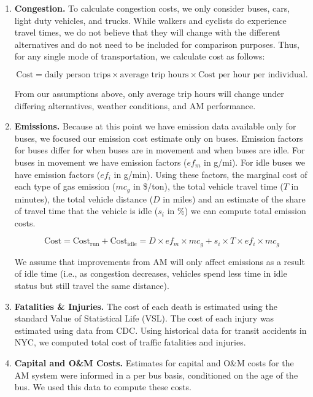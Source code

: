 \documentclass[11pt, letterpaper]{article}
\begin{document}
\begin{enumerate}[leftmargin=*]
\item \textbf{Congestion.}  To calculate congestion costs, we only
  consider
  buses, cars, light duty vehicles, and trucks.  While walkers and
  cyclists do experience travel times, we do not believe that they
  will change with the different alternatives and do not need to be
  included for comparison purposes.  Thus, for any single mode of
  transportation, we calculate cost as follows:
  
  \[\mbox{Cost}=\mbox{daily person trips}\times\mbox{average trip
    hours}\times\mbox{Cost per hour per individual}.\]
  
  From our assumptions above, only average trip hours will change
  under differing alternatives, weather conditions, and AM
  performance.

\item \textbf{Emissions.}  
  Because at this point we have emission data available only for buses, we 
  focused our emission cost estimate only on buses. Emission factors for buses
  differ for when buses are in movement and when buses are idle. For buses in movement 
  we have emission factors ($ef_m$ in g/mi). For idle buses we have emission 
  factors ($ef_{i}$ in g/min). Using these factors, the marginal cost of each type 
  of gas emission ($mc_g$ in \$/ton), the total vehicle travel time ($T$ in minutes), 
  the total vehicle distance ($D$ in miles) and an estimate of the share of travel time that 
  the vehicle is idle ($s_i$ in \%) we can compute total emission costs.

  \[\mbox{Cost}=\mbox{Cost}_{\mbox{run}}+\mbox{Cost}_{\mbox{idle}} = D \times ef_m \times mc_g +  s_i \times T \times  ef_i \times mc_g\]
  
  We assume that improvements from AM will only affect emissions as a result of idle time 
  (i.e., as congestion decreases, vehicles spend less time in idle status but still travel the same distance).
   
\item \textbf{Fatalities \& Injuries.}  
  The cost of each death is estimated using the standard Value of Statistical Life (VSL). The 
  cost of each injury was estimated using data from CDC. Using historical data for transit 
  accidents in NYC, we computed total cost of traffic fatalities and injuries. 
  
\item \textbf{Capital and O\&M Costs.}
  Estimates for capital and O\&M costs for the AM system were informed in a per bus basis, 
  conditioned on the age of the bus. We used this data to compute these costs.
\end{enumerate}
\end{document}

